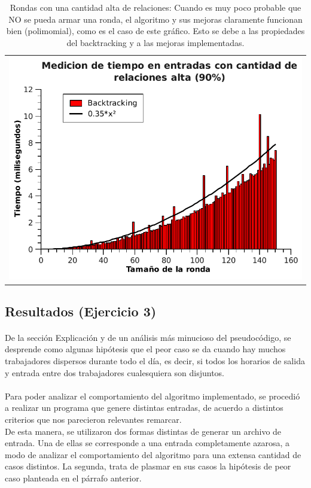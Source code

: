 \begin{table}[h!] %
\centering %
\begin{tabular}{c}
\includegraphics[scale=0.7]{../Ej_2/Otros/Graficos/Graph90.pdf} \\
\end{tabular}

\caption{Rondas con una cantidad alta de relaciones: Cuando es muy poco probable que NO se pueda armar una ronda, el algoritmo y sus mejoras claramente funcionan bien (polimomial), como es el caso de este gráfico. Esto se debe a las propiedades del backtracking y a las mejoras implementadas.} %
\label{tiempoEj2c} %
\end{table}

\newpage
\subsection{Resultados (Ejercicio 3)}
\label{resultadosej3}

\paragraph{}
De la sección Explicación y de un análisis más minucioso del pseudocódigo, se desprende como algunas hipótesis
 que el peor caso se da cuando hay muchos trabajadores dispersos durante todo el día, es decir, si todos los horarios de salida y entrada entre dos trabajadores cualesquiera son disjuntos.

\paragraph{}
Para poder analizar el comportamiento del algoritmo implementado, se procedió a realizar un programa que genere distintas entradas, de acuerdo a distintos criterios que nos parecieron relevantes remarcar.\\
De esta manera, se utilizaron dos formas distintas de generar un archivo de entrada. Una de ellas se corresponde a una entrada completamente azarosa, a modo de analizar el comportamiento del algoritmo para una extensa cantidad de casos distintos. La segunda, trata de plasmar en sus casos la hipótesis de peor caso planteada en el párrafo anterior.

